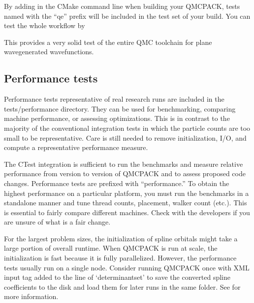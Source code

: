\documentclass[letterpaper,10pt,english]{sphinxmanual}
\begin{document}
By adding  in the CMake command line when building your QMCPACK,
tests named with the “qe\sphinxhyphen{}” prefix will be included in the test set of your build.
You can test the whole  workflow by

\begin{sphinxVerbatim}[commandchars=\\\{\}]
  
\end{sphinxVerbatim}

This provides a very solid test of the entire QMC
toolchain for plane wave\textendash{}generated wavefunctions.


\subsection{Performance tests}
\label{\detokenize{installation:performance-tests}}\label{\detokenize{installation:perftests}}
Performance tests representative of real research runs are included in the
tests/performance directory. They can be used for benchmarking, comparing machine
performance, or assessing optimizations. This is in
contrast to the majority of the conventional integration tests in which the particle
counts are too small to be representative. Care is still needed to
remove initialization, I/O, and compute a representative performance
measure.

The CTest integration is sufficient to run the benchmarks and measure
relative performance from version to version of QMCPACK and to assess
proposed code changes. Performance tests are prefixed with
“performance.” To obtain the highest performance on a particular
platform, you must run the benchmarks in a standalone manner and tune
thread counts, placement, walker count (etc.). This is essential to
fairly compare different machines. Check with the
developers if you are unsure of what is a fair change.

For the largest problem sizes, the initialization of spline orbitals might
take a large portion of overall runtime. When QMCPACK is run at scale,
the initialization is fast because it is fully
parallelized. However, the performance tests usually run on a single node.
Consider running QMCPACK once with  XML input tag
added to the line of ‘determinantset’ to save the converted spline
coefficients to the disk and load them for later runs in the same folder.
See {\hyperref[\detokenize{intro_wavefunction:spo-spline}]{}} for more information.
\end{document}
